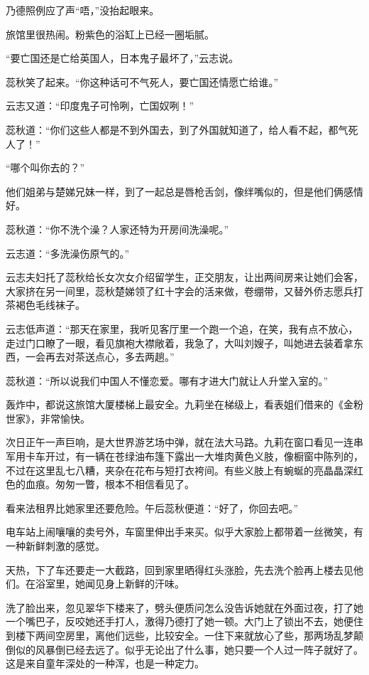 \par 乃德照例应了声“唔，”没抬起眼来。
\par 旅馆里很热闹。粉紫色的浴缸上已经一圈垢腻。
\par “要亡国还是亡给英国人，日本鬼子最坏了，”云志说。
\par 蕊秋笑了起来。“你这种话可不气死人，要亡国还情愿亡给谁。”
\par 云志又道：“印度鬼子可怜咧，亡国奴咧！”
\par 蕊秋道：“你们这些人都是不到外国去，到了外国就知道了，给人看不起，都气死人了！”
\par “哪个叫你去的？”
\par 他们姐弟与楚娣兄妹一样，到了一起总是唇枪舌剑，像绊嘴似的，但是他们俩感情好。
\par 蕊秋道：“你不洗个澡？人家还特为开房间洗澡呢。”
\par 云志道：“多洗澡伤原气的。”
\par 云志夫妇托了蕊秋给长女次女介绍留学生，正交朋友，让出两间房来让她们会客，大家挤在另一间里，蕊秋楚娣领了红十字会的活来做，卷绷带，又替外侨志愿兵打茶褐色毛线袜子。
\par 云志低声道：“那天在家里，我听见客厅里一个跑一个追，在笑，我有点不放心，走过门口瞭了一眼，看见旗袍大襟敞着，我急了，大叫刘嫂子，叫她进去装着拿东西，一会再去对茶送点心，多去两趟。”
\par 蕊秋道：“所以说我们中国人不懂恋爱。哪有才进大门就让人升堂入室的。”
\par 轰炸中，都说这旅馆大厦楼梯上最安全。九莉坐在梯级上，看表姐们借来的《金粉世家》，非常愉快。
\par 次日正午一声巨响，是大世界游艺场中弹，就在法大马路。九莉在窗口看见一连串军用卡车开过，有一辆在苍绿油布篷下露出一大堆肉黄色义肢，像橱窗中陈列的，不过在这里乱七八糟，夹杂在花布与短打衣袴间。有些义肢上有蜿蜒的亮晶晶深红色的血痕。匆匆一瞥，根本不相信看见了。
\par 看来法租界比她家里还要危险。午后蕊秋便道：“好了，你回去吧。”
\par 电车站上闹嚷嚷的卖号外，车窗里伸出手来买。似乎大家脸上都带着一丝微笑，有一种新鲜刺激的感觉。
\par 天热，下了车还要走一大截路，回到家里晒得红头涨脸，先去洗个脸再上楼去见他们。在浴室里，她闻见身上新鲜的汗味。
\par 洗了脸出来，忽见翠华下楼来了，劈头便质问怎么没告诉她就在外面过夜，打了她一个嘴巴子，反咬她还手打人，激得乃德打了她一顿。大门上了锁出不去，她便住到楼下两间空房里，离他们远些，比较安全。一住下来就放心了些，那两场乱梦颠倒似的风暴倒已经去远了。似乎无论出了什么事，她只要一个人过一阵子就好了。这是来自童年深处的一种浑，也是一种定力。
